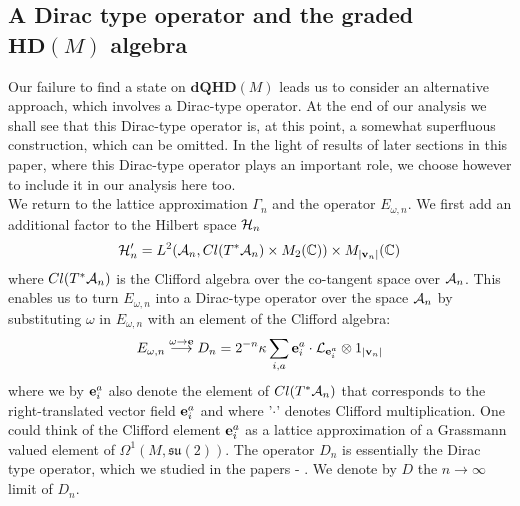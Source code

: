 \documentclass[12pt]{article}
\def\oo{\omega}
\def\G{\Gamma}
\def\ca{{\cal A}}
\def\ch{{\cal H}}
\def\cl{{\cal L}}
\begin{document}









\subsection{A Dirac type operator and the graded $\mathbf{HD}(M)$ algebra}


Our failure to find a state on $\mathbf{dQHD}(M)$ leads us to consider an alternative approach, which involves a Dirac-type operator. At the end of our analysis we shall see that this Dirac-type operator is, at this point, a somewhat superfluous construction, which can be omitted. In the light of results of later sections in this paper, where this Dirac-type operator plays an important role, we choose however to include it in our analysis here too.  \\



We return to the lattice approximation $\G_n$ and the operator $E_{\oo,n}$. We first add an additional factor to the Hilbert space $\ch_n$
$$
\ch'_n  = L^2(\ca_{n}, Cl(T^*\ca_n)\times M_2(\mathbb{C}))\times M_{\vert {\bf v}_n\vert}(\mathbb{C})
$$
where $Cl(T^*\ca_n)$ is the Clifford algebra over the co-tangent space over $\ca_n$. %
This enables us to turn $E_{\oo,n}$ into a Dirac-type operator over the space $\ca_n$ by substituting $\oo$ in $E_{\oo,n}$ with an element of the Clifford algebra:
\begin{equation}
E_{\oo,n}  \stackrel{\oo\rightarrow{\bf e}}{\longrightarrow} D_n = 2^{-n}\kappa \sum_{i,a}  {\bf e}_i^a \cdot \cl_{{\bf e}_i^a} \otimes 1_{\vert {\bf v}_n\vert }
\label{Rothstein}
\end{equation}
where we by ${\bf e}_i^a$ also denote the element of $Cl(T^*\ca_n)$ that corresponds to the right-translated vector field ${\bf e}_i^a$ and where '$\cdot$' denotes Clifford multiplication. One could think of the Clifford element ${\bf e}_i^a$ as a lattice approximation of a Grassmann valued element of $\Omega^1(M,\mathfrak{su}(2))$. The operator $D_n$ is essentially the Dirac type operator, which we studied in the papers \cite{Aastrup:2012jj}-\cite{AGNP1} . We denote by $D$ the $n\rightarrow\infty$ limit of $D_n$.
\end{document}

